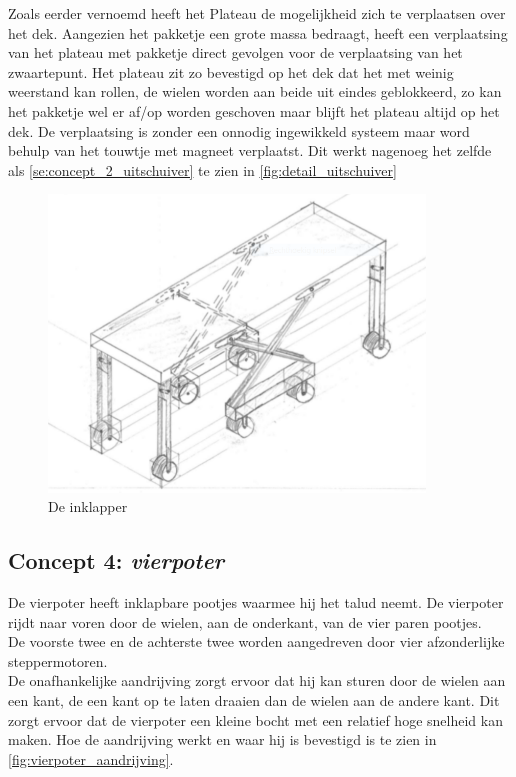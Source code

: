 Zoals eerder vernoemd heeft het Plateau de mogelijkheid zich te verplaatsen over het dek. Aangezien het pakketje een grote massa bedraagt, heeft een verplaatsing van het plateau met pakketje direct gevolgen voor de verplaatsing van het zwaartepunt. Het plateau zit zo bevestigd op het dek dat het met weinig weerstand kan rollen, de wielen worden aan beide uit eindes geblokkeerd, zo kan het pakketje wel er af/op worden geschoven maar blijft het plateau altijd op het dek. De verplaatsing is zonder een onnodig ingewikkeld systeem maar word behulp van het touwtje met magneet verplaatst. Dit werkt nagenoeg het zelfde als \cref{se:concept_2_uitschuiver} te zien in \cref{fig:detail_uitschuiver}\\

\begin{figure}[H]
    \includegraphics[width = 100mm]{04_idee_ontwikkeling/Foto_inklapper.PNG}
    \caption{De inklapper}
    \label{fig:inklapper}
\end{figure}

\subsection{Concept 4: \textit{vierpoter}}
\label{se:vierpoter}
\vspace{\baselineskip}
De vierpoter heeft inklapbare pootjes waarmee hij het talud neemt. De vierpoter rijdt naar voren door de wielen, aan de onderkant, van de vier paren pootjes.\\
De voorste twee en de achterste twee worden aangedreven door vier afzonderlijke steppermotoren. \\
De onafhankelijke aandrijving zorgt ervoor dat hij kan sturen door de wielen aan een kant, de een kant op te laten draaien dan de wielen aan de andere kant. Dit zorgt ervoor dat de vierpoter een kleine bocht met een relatief hoge snelheid kan maken.  Hoe de aandrijving werkt en waar hij is bevestigd is te zien in \cref{fig:vierpoter_aandrijving}.\\

